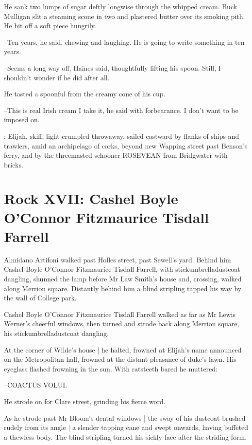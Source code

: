 He sank two lumps of sugar deftly longwise
through the whipped
cream.
Buck Mulligan slit a steaming scone in two
and plastered butter
over its smoking pith.
He bit off a soft piece hungrily.

--Ten years,
he said,
chewing and laughing.
He is going to write something in ten years.%

--Seems a long way off,
Haines said,
thoughtfully lifting his spoon.
Still, I shouldn't wonder if he did after all.

He tasted a spoonful from the creamy cone of his cup.

--This is real Irish cream I take it,
he said with forbearance.
I don't want to be imposed on.

:
Elijah,
skiff,
light crumpled throwaway,
sailed eastward by flanks of
ships and trawlers,
amid an archipelago of corks,
beyond new Wapping
street
past Benson's ferry,
and by the threemasted schooner ROSEVEAN from
Bridgwater with bricks.


\section*{Rock XVII: Cashel Boyle O'Connor Fitzmaurice Tisdall Farrell}


Almidano Artifoni walked past Holles street,
past Sewell's yard.
Behind him
Cashel Boyle O'Connor Fitzmaurice Tisdall Farrell,
with
stickumbrelladustcoat dangling,
shunned the lamp before Mr Law Smith's
house
and, crossing, walked along Merrion square.
Distantly behind him a
blind stripling
tapped his way by the wall of College park.

Cashel Boyle O'Connor Fitzmaurice Tisdall Farrell
walked as far as
Mr Lewis Werner's cheerful windows,
then turned and strode back along
Merrion square,
his stickumbrelladustcoat dangling.

At the corner of Wilde's house |
he halted,
frowned at Elijah's name announced on the Metropolitan hall,
frowned at the distant pleasance of duke's lawn.
His eyeglass flashed frowning in the sun.
With ratsteeth bared he muttered:

--COACTUS VOLUI.

He strode on for Clare street,
grinding his fierce word.

As he strode past Mr Bloom's dental windows |
the sway of his dustcoat brushed rudely from its angle |
a slender tapping cane and swept onwards,
having buffeted a thewless body.
The blind stripling turned his sickly face after the striding form.

